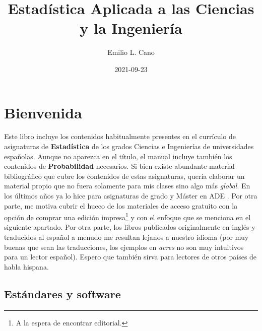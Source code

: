\documentclass[
]{book}
\title{Estadística Aplicada a las Ciencias y la Ingeniería}
\author{Emilio L. Cano}
\date{2021-09-23}
\begin{document}
\maketitle

{
\setcounter{tocdepth}{1}
\tableofcontents
}
\hypertarget{bienvenida}{%
\chapter*{Bienvenida}\label{bienvenida}}

Este libro incluye los contenidos habitualmente presentes en el currículo
de asignaturas de \textbf{Estadística} de los grados Ciencias e Ingenierías de universidades españolas. Aunque no aparezca en el título, el manual incluye también los contenidos de \textbf{Probabilidad} necesarios.
Si bien existe abundante material bibliográfico
que cubre los contenidos de estas asignaturas, quería elaborar un material
propio que no fuera solamente para mis clases sino algo más
\emph{global}. En los últimos años ya lo hice para asignaturas de grado y Máster en ADE \citep{libroeee, libroadr}. Por otra parte, me motiva cubrir el hueco de los materiales
de acceso gratuito con la opción de comprar una edición
impresa\footnote{A la espera de encontrar editorial.} y con el enfoque
que se menciona en el siguiente apartado. Por otra parte, los libros publicados
originalmente en inglés y traducidos al español a menudo me resultan lejanos
a nuestro idioma (por muy buenas que sean las traducciones, los ejemplos en \emph{acres}
no son muy intuitivos para un lector español). Espero que también sirva para
lectores de otros países de habla hispana.

\hypertarget{estuxe1ndares-y-software}{%
\section*{Estándares y software}\label{estuxe1ndares-y-software}}
\end{document}
